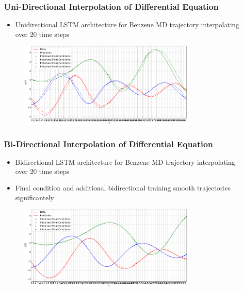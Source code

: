 \documentclass[usenames, dvipsnames, t]{beamer}
\begin{document}
\begin{frame}
	\frametitle{Uni-Directional Interpolation of Differential Equation}
	\begin{itemize}
		 \item Unidirectional LSTM architecture for Benzene MD trajectory interpolating over 20 time steps
	\end{itemize}
	\begin{figure}
		 \centering
		 \includegraphics[width=0.8\textwidth]{ExampleTrajectory.png}
	\end{figure}
\end{frame}

\begin{frame}
	\frametitle{Bi-Directional Interpolation of Differential Equation}
	\begin{itemize}
		 \item Bidirectional LSTM architecture for Benzene MD trajectory interpolating over 20 time steps
		 \item Final condition and additional bidirectional training smooth trajectories significantely
	\end{itemize}
	\begin{figure}
		 \centering
		 \includegraphics[width=0.8\textwidth]{ExampleTrajectoryBi.png}
	\end{figure}
\end{frame}
\end{document}
